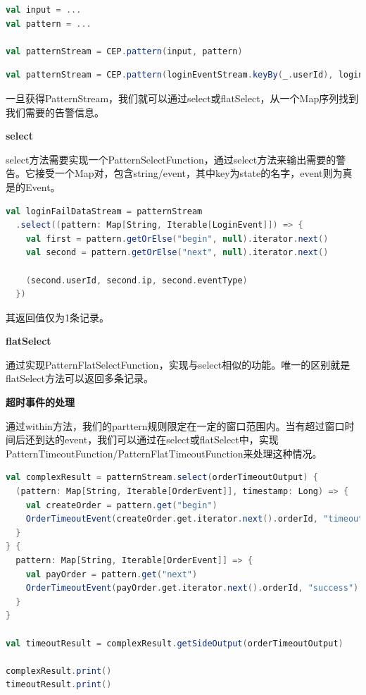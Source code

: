 \documentclass[oneside]{ctexbook}
\begin{document}
\begin{lstlisting}[language=scala]
val input = ...
val pattern = ...

val patternStream = CEP.pattern(input, pattern)
\end{lstlisting}

\begin{lstlisting}[language=scala]
val patternStream = CEP.pattern(loginEventStream.keyBy(_.userId), loginFailPattern)
\end{lstlisting}

一旦获得PatternStream，我们就可以通过select或flatSelect，从一个Map序列找到我们需要的告警信息。

\textbf{select}

select方法需要实现一个PatternSelectFunction，通过select方法来输出需要的警告。它接受一个Map对，包含string/event，其中key为state的名字，event则为真是的Event。

\begin{lstlisting}[language=scala]
val loginFailDataStream = patternStream
  .select((pattern: Map[String, Iterable[LoginEvent]]) => {
    val first = pattern.getOrElse("begin", null).iterator.next()
    val second = pattern.getOrElse("next", null).iterator.next()

    (second.userId, second.ip, second.eventType)
  })
\end{lstlisting}

其返回值仅为1条记录。

\textbf{flatSelect}

通过实现PatternFlatSelectFunction，实现与select相似的功能。唯一的区别就是flatSelect方法可以返回多条记录。

\textbf{超时事件的处理}

通过within方法，我们的parttern规则限定在一定的窗口范围内。当有超过窗口时间后还到达的event，我们可以通过在select或flatSelect中，实现PatternTimeoutFunction/PatternFlatTimeoutFunction来处理这种情况。

\begin{lstlisting}[language=scala]
val complexResult = patternStream.select(orderTimeoutOutput) {
  (pattern: Map[String, Iterable[OrderEvent]], timestamp: Long) => {
    val createOrder = pattern.get("begin")
    OrderTimeoutEvent(createOrder.get.iterator.next().orderId, "timeout")
  }
} {
  pattern: Map[String, Iterable[OrderEvent]] => {
    val payOrder = pattern.get("next")
    OrderTimeoutEvent(payOrder.get.iterator.next().orderId, "success")
  }
}

val timeoutResult = complexResult.getSideOutput(orderTimeoutOutput)

complexResult.print()
timeoutResult.print()
\end{lstlisting}
\end{document}
